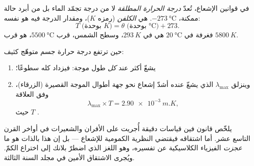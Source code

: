 \begin{definition}\label{def:g10:light-spectra:kelvin}
في قوانين الإشعاع، تُعدّ \emph{درجة الحرارة المطلقة} لا من درجة تجمّد الماء بل من
أبرد حالة ممكنة،
$\qty{-273}{\degreeCelsius}$.  هي \emph{الكلفن}
(رمزه $\unit{K}$)، ومقدار الدرجة فيه هو نفسه:
\[
T \text{ (بوحدة } \unit{K}) = \theta \text{ (بوحدة } \unit{\degreeCelsius}) + 273 .
\]
فغرفة في $\qty{20}{\degreeCelsius}$ هي في $\qty{293}{K}$، وسطح
الشمس، قرب $\qty{5500}{\degreeCelsius}$، هو قرب
$\qty{5800}{K}$.
\end{definition}

\begin{proposition}\label{prop:g10:light-spectra:wien}
حين ترتفع درجة حرارة جسم متوهّج كثيف:
\begin{enumerate}
  \item يشعّ أكثر عند \emph{كل} طول موجة: فيزداد  كله
        سطوعًا؛
  \item وينزلق  $\lambda_{\max}$ الذي يشعّ عنده أشدّ
        إشعاع نحو جهة أطوال الموجة القصيرة (الزرقاء)،
        وفق العلاقة
        \[
        \lambda_{\max} \times T = \qty{2.90e-3}{m.K},
        \]
        حيث $T$  .
\end{enumerate}
\end{proposition}
\admitted

\begin{remark}\label{rem:g10:light-spectra:wienorigin}
يلخّص قانون فين قياسات دقيقة أُجريت على الأفران والشعيرات
في أواخر القرن التاسع عشر. أما اشتقاقه فيقتضي النظرية الكمومية
للإشعاع --- بل إن هذا  بالذات هو ما \emph{عجزت}
الفيزياء الكلاسيكية عن تفسيره، وهو اللغز الذي اضطرّ
بلانك إلى اختراع الكمّ. ويُجرى الاشتقاق الأمين في
مجلد السنة الثالثة.
\end{remark}

